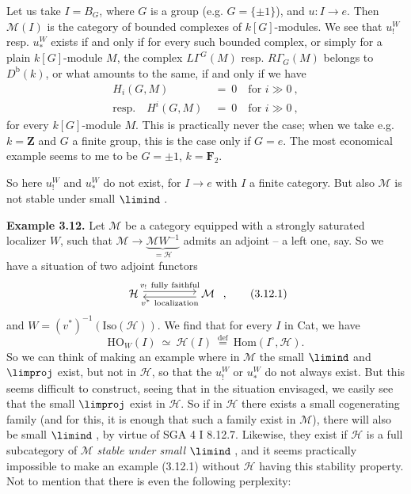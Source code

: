Let us take $I=B_G$, where $G$ is a group (e.g. $G=\{\pm1\}$), and $u : I \longrightarrow e$. Then $\mathcal{M}(I)$ is the category of bounded complexes of $k[G]$-modules. We see that $u_!^W$ resp. $u_*^W$ exists if and only if for every such bounded complex, or simply for a plain $k[G]$-module $M$, the complex $L\Gamma^G(M)$ resp. $R\Gamma_G(M)$ belongs to $D^{\mathrm{b}}(k)$, or what amounts to the same,
if and only if we have
\[
\begin{aligned}
H_i(G,M) \ &= \ 0 \quad \text{for } i \gg 0 \ ,\\
\text{resp.}\quad H^i(G,M) \ &= \ 0 \quad \text{for } i \gg 0 \ ,
\end{aligned}
\]
for every $k[G]$-module $M$. This is practically never the case; when we take e.g. $k=\mathbf{Z}$ and $G$ a finite group, this is the case only if $G=e$. The most economical example seems to me to be $G=\pm1$, $k=\mathbf{F}_2$.

So here $u_!^W$ and $u_*^W$ do not exist, for $I \longrightarrow e$ with $I$ a finite category. But also $\mathcal{M}$ is not stable under small $\limind$ .

\textbf{Example 3.12.} Let $\mathcal{M}$ be a category equipped with a strongly saturated localizer $W$, such that $\mathcal{M} \longrightarrow \underbrace{\mathcal{M}W^{-1}}_{=\mathcal{H}}$ admits an adjoint -- a left one, say. So we have a situation of two adjoint functors %
\[
\begin{tikzcd}[column sep=huge]
\mathcal{H} \arrow[r, shift left, "v_!\ \text{fully faithful}"] & \mathcal{M} \arrow[l, shift left, "v^*\ \text{localization}"]
\end{tikzcd}
\ , \tag*{(3.12.1)}
\]
and $W=(v^*)^{-1}(\mathrm{Iso}(\mathcal{H}))$. We find that for every $I$ in Cat, we have
\[
\mathrm{HO}_W(I) \ \simeq \ \mathcal{H}(I) \ \overset{\text{def}}{=} \ \mathrm{Hom}(I^\circ,\mathcal{H}). \tag*{(3.12.2)} %
\]
So we can think of making an example where in $\mathcal{M}$ the small $\limind$ and $\limproj$ exist, but not in $\mathcal{H}$, so that the $u_!^W$ or $u_*^W$ do not always exist. But this seems difficult to construct, seeing that in the situation envisaged, we easily see that the small $\limproj$ exist in $\mathcal{H}$. So if in $\mathcal{H}$ %
there exists a small cogenerating family (and for this, it is enough that such a family exist in $\mathcal{M}$), there will also be small $\limind$ , by virtue of SGA 4 I 8.12.7. Likewise, they exist if $\mathcal{H}$ is a full subcategory of $\mathcal{M}$ \textit{stable under small} $\limind$ , and it seems practically impossible to make an example (3.12.1) without $\mathcal{H}$ having this stability property. Not to mention that there is even the following perplexity:

